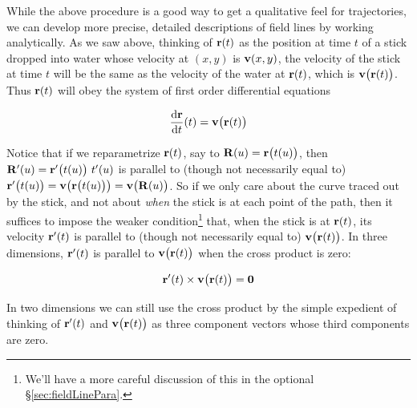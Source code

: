 While the above procedure is a good way to get a qualitative feel 
for trajectories,
we can develop more precise, detailed descriptions of field lines by
working analytically. As we saw above, thinking of $\mathbf{r}(t)$ as the position
at time $t$ of a stick dropped into water whose velocity at $(x,y)$ is $\mathbf{v}(x,y)$, the velocity of the stick at time $t$ will be the same 
as the velocity of the  water at $\mathbf{r}(t)$, which is $\mathbf{v}\big(\mathbf{r}(t)\big)$. 
Thus $\mathbf{r}(t)$ will obey the system of first order differential equations
\begin{impeqn}\label{eq:VFstreamLineA}
\begin{equation*}
\diff{\vr}{t}(t) = \vv\big(\vr(t)\big) 
\end{equation*}
\end{impeqn}

Notice that if we reparametrize $\mathbf{r}(t)$, say to $\mathbf{R}(u) = \mathbf{r}\big(t(u)\big)$,
then $\mathbf{R}'(u) =   \mathbf{r}'\big(t(u)\big)\ t'(u)$ is parallel to
(though not necessarily equal to) $\mathbf{r}'\big(t(u)\big)= \mathbf{v}\big(\mathbf{r}\big(t(u)\big)\big)
                         =\mathbf{v}\big(\mathbf{R}(u)\big)$. 
So if we only care about the curve traced out by the stick, and not about 
\emph{when} the stick is at each point of the path, then it suffices to
impose the weaker condition\footnote{We'll have a more careful discussion of 
this in the optional \S\ref{sec:fieldLinePara}.} that, when the stick 
is at $\mathbf{r}(t)$, its velocity $\mathbf{r}'(t)$ is parallel to (though not necessarily equal to) 
$\mathbf{v}\big(\mathbf{r}(t)\big)$. In three dimensions, $\mathbf{r}'(t)$ is parallel to 
$\mathbf{v}\big(\mathbf{r}(t)\big)$ when the cross product is zero:
\begin{impeqn}\label{eq:VFstreamLineBB}
\begin{equation*}
\mathbf{r}'(t)\times\mathbf{v}\big(\mathbf{r}(t)\big)=\mathbf{0}
\end{equation*}
\end{impeqn}
\noindent
In two dimensions we can still use the cross product by the simple
expedient of thinking of $\mathbf{r}'(t)$ and $\mathbf{v}\big(\mathbf{r}(t)\big)$ as three component
vectors whose third components are zero. 


